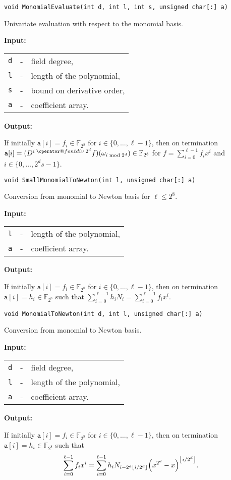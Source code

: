 \documentclass{amsart}
\makeatletter
\newcommand{\floor}[1]{\left\lfloor #1\right\rfloor}
\newcommand{\F}{\mathbb{F}}
\newcommand{\Input}{\textbf{Input:}}
\newcommand{\Output}{\textbf{Output:}}
\newcommand*{\bdiv}{%
	\nonscript\mskip-\medmuskip\mkern5mu%
	\mathbin{\operator@font div}\penalty900\mkern5mu%
	\nonscript\mskip-\medmuskip
}
\let\originalleft\left
\let\originalright\right
\renewcommand{\left}{\mathopen{}\mathclose\bgroup\originalleft}
\renewcommand{\right}{\aftergroup\egroup\originalright}
\newenvironment{inputs}{\Input\par\begin{tabular}{@{}rcl}}{\end{tabular}}
\newenvironment{outputs}{\Output\par}{}
\makeatother
\begin{document}
\texttt{void MonomialEvaluate(int d, int l, int s, unsigned char[:]\ a)}

Univariate evaluation with respect to the monomial basis.

\begin{inputs}
	\texttt{d} & - & field degree,              \\
	\texttt{l} & - & length of the polynomial,  \\
	\texttt{s} & - & bound on derivative order, \\
	\texttt{a} & - & coefficient array.
\end{inputs}

\begin{outputs}
	If initially $\texttt{a}[i]=f_i\in\F_{2^8}$ for $i\in\{0,\dotsc,\ell-1\}$, then
	on termination
	$\texttt{a}[i]=(D^{i\bdiv{2^d}}f)(\omega_{i\bmod{2^d}})\in\F_{2^8}$ for
	$f=\sum^{\ell-1}_{i=0}f_ix^i$ and $i\in\{0,\dotsc,2^ds-1\}$.
\end{outputs}

\texttt{void SmallMonomialToNewton(int l, unsigned char[:]\ a)}

Conversion from monomial to Newton basis for $\ell\leq 2^8$.

\begin{inputs}
	\texttt{l} & - & length of the polynomial, \\
	\texttt{a} & - & coefficient array.
\end{inputs}

\begin{outputs}
	If initially $\texttt{a}[i]=f_i\in\F_{2^8}$ for $i\in\{0,\dotsc,\ell-1\}$, then
	on termination $\texttt{a}[i]=h_i\in\F_{2^8}$ such that
	$\sum^{\ell-1}_{i=0}h_iN_i=\sum^{\ell-1}_{i=0}f_ix^i$.
\end{outputs}

\texttt{void MonomialToNewton(int d, int l, unsigned char[:]\ a)}

Conversion from monomial to Newton basis.

\begin{inputs}
	\texttt{d} & - & field degree,             \\
	\texttt{l} & - & length of the polynomial, \\
	\texttt{a} & - & coefficient array.
\end{inputs}

\begin{outputs}
	If initially $\texttt{a}[i]=f_i\in\F_{2^8}$ for $i\in\{0,\dotsc,\ell-1\}$, then
	on termination $\texttt{a}[i]=h_i\in\F_{2^8}$ such that
	\begin{equation}\label{eqn:gen-newton-monomial}
		\sum^{\ell-1}_{i=0}f_ix^i
		=
		\sum^{\ell-1}_{i=0}
		h_i
		N_{i-2^d\floor{i/2^d}}
		\left(x^{2^d}-x\right)^{\floor{i/2^d}}.
	\end{equation}
\end{outputs}
\end{document}
